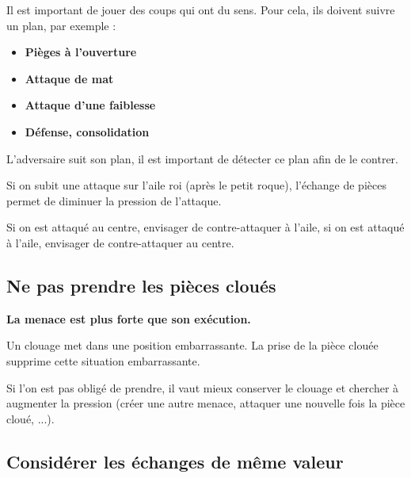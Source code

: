 Il est important de jouer des coups qui ont du sens. Pour cela, ils doivent suivre un plan, par exemple : 

\begin{itemize}[leftmargin=2.7cm, label=, itemsep=0pt]%
\item  {\bf Pièges à l'ouverture}
\item  {\bf Attaque de mat}
\item  {\bf Attaque d'une faiblesse}
\item  {\bf Défense, consolidation}
\end{itemize}

L'adversaire suit son plan, il est important de détecter ce plan afin de le contrer.

{\footnotesize %

Si on subit une attaque sur l'aile roi (après le petit roque), l'échange de pièces permet de diminuer la pression de l'attaque.

Si on est attaqué au centre, envisager de contre-attaquer à l'aile, si on est attaqué à l'aile, envisager de contre-attaquer au centre.


}

\subsection{Ne pas prendre les pièces cloués}

{\bf La menace est plus forte que son exécution.}

Un clouage met dans une position embarrassante. La prise de la pièce clouée supprime cette situation embarrassante.

Si l'on est pas obligé de prendre, il vaut mieux conserver le clouage et chercher à augmenter la pression (créer une autre menace, attaquer une nouvelle fois la pièce cloué, ...).


%
%
\subsection{Considérer les échanges de même valeur}

